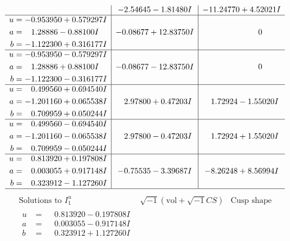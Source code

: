 \documentclass[1p]{elsarticle_modified}
\theoremstyle{definition}
\newcommand{\I}{\sqrt{-1}}
\begin{document}
$$\begin{array}{c|c|c}
 & -2.54645 - 1.81480 I & -11.24770 + 4.52021 I \\ \hline\begin{aligned}
u &= -0.953950 + 0.579297 I \\
a &= \phantom{-}1.28886 - 0.88100 I \\
b &= -1.122300 + 0.316177 I\end{aligned}
 & -0.08677 + 12.83750 I & \phantom{-0.000000 } 0 \\ \hline\begin{aligned}
u &= -0.953950 - 0.579297 I \\
a &= \phantom{-}1.28886 + 0.88100 I \\
b &= -1.122300 - 0.316177 I\end{aligned}
 & -0.08677 - 12.83750 I & \phantom{-0.000000 } 0 \\ \hline\begin{aligned}
u &= \phantom{-}0.499560 + 0.694540 I \\
a &= -1.201160 + 0.065538 I \\
b &= \phantom{-}0.709959 + 0.050244 I\end{aligned}
 & \phantom{-}2.97800 + 0.47203 I & \phantom{-}1.72924 - 1.55020 I \\ \hline\begin{aligned}
u &= \phantom{-}0.499560 - 0.694540 I \\
a &= -1.201160 - 0.065538 I \\
b &= \phantom{-}0.709959 - 0.050244 I\end{aligned}
 & \phantom{-}2.97800 - 0.47203 I & \phantom{-}1.72924 + 1.55020 I \\ \hline\begin{aligned}
u &= \phantom{-}0.813920 + 0.197808 I \\
a &= \phantom{-}0.003055 + 0.917148 I \\
b &= \phantom{-}0.323912 - 1.127260 I\end{aligned}
 & -0.75535 - 3.39687 I & -8.26248 + 8.56994 I\\
 \hline 
 \end{array}$$\newpage$$\begin{array}{c|c|c}  
\text{Solutions to }I^u_{1}& \I (\text{vol} + \sqrt{-1}CS) & \text{Cusp shape}\\
 \hline 
\begin{aligned}
u &= \phantom{-}0.813920 - 0.197808 I \\
a &= \phantom{-}0.003055 - 0.917148 I \\
b &= \phantom{-}0.323912 + 1.127260 I\end{aligned}

\end{array}$$
\end{document}
